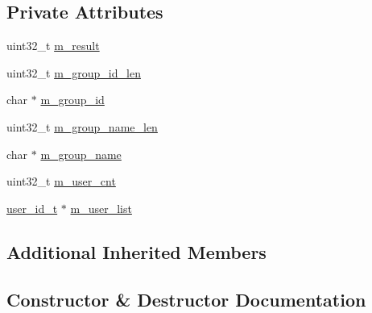 \subsection*{Private Attributes}
\begin{DoxyCompactItemize}
\item 
uint32\+\_\+t \hyperlink{class_c_im_pdu_client_group_create_tmp_group_response_ae61a41b11407b18df520b2c699acc37d}{m\+\_\+result}
\item 
uint32\+\_\+t \hyperlink{class_c_im_pdu_client_group_create_tmp_group_response_acca763f73e127fac02590beaeed98d94}{m\+\_\+group\+\_\+id\+\_\+len}
\item 
char $\ast$ \hyperlink{class_c_im_pdu_client_group_create_tmp_group_response_aa0331b5270eb8e178831375d0195873b}{m\+\_\+group\+\_\+id}
\item 
uint32\+\_\+t \hyperlink{class_c_im_pdu_client_group_create_tmp_group_response_aa0d1d5a26d5f662cd2c8466ee7f4a3b0}{m\+\_\+group\+\_\+name\+\_\+len}
\item 
char $\ast$ \hyperlink{class_c_im_pdu_client_group_create_tmp_group_response_a57ced3f320cbcc597b9d3307bbeabde1}{m\+\_\+group\+\_\+name}
\item 
uint32\+\_\+t \hyperlink{class_c_im_pdu_client_group_create_tmp_group_response_a00427349d1b3d42471b4520e940c4755}{m\+\_\+user\+\_\+cnt}
\item 
\hyperlink{structuser__id__t}{user\+\_\+id\+\_\+t} $\ast$ \hyperlink{class_c_im_pdu_client_group_create_tmp_group_response_aa1ff7ef4b9764b4684c2f9c8c4931433}{m\+\_\+user\+\_\+list}
\end{DoxyCompactItemize}
\subsection*{Additional Inherited Members}


\subsection{Constructor \& Destructor Documentation}
\hypertarget{class_c_im_pdu_client_group_create_tmp_group_response_ad950c70946be24e4a1cfd65bbc6a09b9}{}
